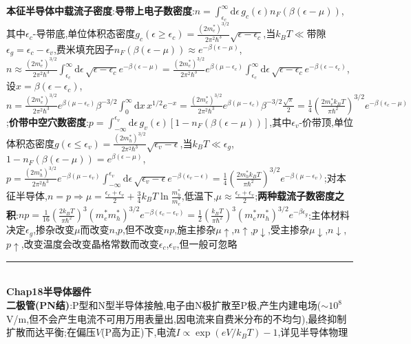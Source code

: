 \documentclass[UTF8,10pt,a4paper]{article}
\begin{document}
\begin{multicols}{2}
\textbf{本征半导体中载流子密度}:\textbf{导带上电子数密度}:$n=\int_{\epsilon_c}^{\infty}\mathrm{d}\epsilon\,g_c(\epsilon)n_F(\beta(\epsilon-\mu))$,其中$\epsilon_c$-导带底,单位体积态密度$g_c(\epsilon\geq\epsilon_c)=\frac{(2m_e^*)^{3/2}}{2\pi^2\hbar^3}\sqrt{\epsilon-\epsilon_c}$,当$k_BT\ll$带隙$\epsilon_g=\epsilon_c-\epsilon_v$,费米填充因子$n_F(\beta(\epsilon-\mu))\approx e^{-\beta(\epsilon-\mu)}$,$n\approx\frac{(2m_e^*)^{3/2}}{2\pi^2\hbar^3}\int_{\epsilon_c}^{\infty}\mathrm{d}\epsilon\,\sqrt{\epsilon-\epsilon_c}e^{-\beta(\epsilon-\mu)}=\frac{(2m_e^*)^{3/2}}{2\pi^2\hbar^3}e^{\beta(\mu-\epsilon_c)}\int_{\epsilon_c}^{\infty}\mathrm{d}\epsilon\,\sqrt{\epsilon-\epsilon_c}e^{-\beta(\epsilon-\epsilon_c)}$,设$x=\beta(\epsilon-\epsilon_c)$,$n=\frac{(2m_e^*)^{3/2}}{2\pi^2\hbar^3}e^{\beta(\mu-\epsilon_c)}\beta^{-3/2}\int_0^{\infty}\mathrm{d}x\,x^{1/2}e^{-x}=\frac{(2m_e^*)^{3/2}}{2\pi^2\hbar^3}e^{\beta(\mu-\epsilon_c)}\beta^{-3/2}\frac{\sqrt{\pi}}{2}=\frac{1}{4}(\frac{2m_e^*k_BT}{\pi\hbar^2})^{3/2}e^{-\beta(\epsilon_c-\mu)}$;\textbf{价带中空穴数密度}:$p=\int_{-\infty}^{\epsilon_v}\mathrm{d}\epsilon\,g_v(\epsilon)[1-n_F(\beta(\epsilon-\mu))]$,其中$\epsilon_v$-价带顶,单位体积态密度$g(\epsilon\leq\epsilon_v)=\frac{(2m_h^*)^{3/2}}{2\pi^2\hbar^3}\sqrt{\epsilon_v-\epsilon}$,当$k_BT\ll\epsilon_g$,$1-n_F(\beta(\epsilon-\mu))=e^{\beta(\epsilon-\mu)}$,$p=\frac{(2m_h^*)^{3/2}}{2\pi^2\hbar^3}e^{-\beta(\mu-\epsilon_v)}\int_{-\infty}^{\epsilon_v}\mathrm{d}\epsilon\,\sqrt{\epsilon_v-\epsilon}e^{-\beta(\epsilon_v-\epsilon)}=\frac{1}{4}(\frac{2m_h^*k_BT}{\pi\hbar^2})^{3/2}e^{-\beta(\mu-\epsilon_v)}$;对本征半导体,$n=p\Rightarrow\mu=\frac{\epsilon_c+\epsilon_v}{2}+\frac{3}{4}k_BT\ln\frac{m_h^*}{m_e^*}$,低温下,$\mu\approx\frac{\epsilon_c+\epsilon_v}{2}$;\textbf{两种载流子数密度之积}:$np=\frac{1}{16}(\frac{2k_BT}{\pi\hbar^2})^3(m_e^*m_h^*)^{3/2}e^{-\beta(\epsilon_c-\epsilon_v)}=\frac{1}{2}(\frac{k_BT}{\pi\hbar^2})^3(m_e^*m_h^*)^{3/2}e^{-\beta\epsilon_g}$;主体材料决定$\epsilon_g$,掺杂改变$\mu$而改变$n$,$p$,但不改变$np$,施主掺杂$\mu\uparrow$,$n\uparrow$,$p\downarrow$,受主掺杂$\mu\downarrow$,$n\downarrow$,$p\uparrow$,改变温度会改变晶格常数而改变$\epsilon_c$,$\epsilon_v$,但一般可忽略\\
\rule{\columnwidth}{.2pt}\\
\textbf{Chap18半导体器件}\\
\textbf{二极管(PN结)}:P型和N型半导体接触,电子由N极扩散至P极,产生内建电场($\sim 10^8$V/m,但不会产生电流不可用万用表量出,因电流来自费米分布的不均匀),最终抑制扩散而达平衡;在偏压$V$(P高为正)下,电流$I\propto\exp(eV/k_BT)-1$,详见半导体物理\\

\end{multicols}
\end{document}
